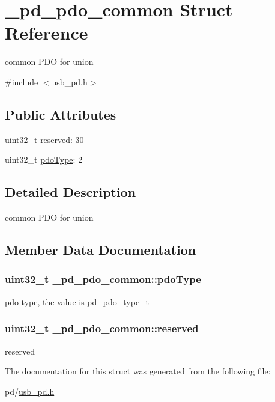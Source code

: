 \hypertarget{struct__pd__pdo__common}{\section{\-\_\-pd\-\_\-pdo\-\_\-common Struct Reference}
\label{struct__pd__pdo__common}
}


common P\-D\-O for union  




{\ttfamily \#include $<$usb\-\_\-pd.\-h$>$}

\subsection*{Public Attributes}
\begin{DoxyCompactItemize}
\item 
uint32\-\_\-t \hyperlink{struct__pd__pdo__common_abf0630cb9ee09ce0bb24f2455f048e40}{reserved}\-: 30
\item 
uint32\-\_\-t \hyperlink{struct__pd__pdo__common_a5a1a819ee8e548be9b972852c75aa597}{pdo\-Type}\-: 2
\end{DoxyCompactItemize}


\subsection{Detailed Description}
common P\-D\-O for union 

\subsection{Member Data Documentation}
\hypertarget{struct__pd__pdo__common_a5a1a819ee8e548be9b972852c75aa597}{
\subsubsection[{pdo\-Type}]{\setlength{\rightskip}{0pt plus 5cm}uint32\-\_\-t \-\_\-pd\-\_\-pdo\-\_\-common\-::pdo\-Type}}\label{struct__pd__pdo__common_a5a1a819ee8e548be9b972852c75aa597}
pdo type, the value is \hyperlink{group__usb__pd__stack_ga1ed8c8629c16f0246f723f164abfe7d4}{pd\-\_\-pdo\-\_\-type\-\_\-t} \hypertarget{struct__pd__pdo__common_abf0630cb9ee09ce0bb24f2455f048e40}{
\subsubsection[{reserved}]{\setlength{\rightskip}{0pt plus 5cm}uint32\-\_\-t \-\_\-pd\-\_\-pdo\-\_\-common\-::reserved}}\label{struct__pd__pdo__common_abf0630cb9ee09ce0bb24f2455f048e40}
reserved 

The documentation for this struct was generated from the following file\-:\begin{DoxyCompactItemize}
\item 
pd/\hyperlink{usb__pd_8h}{usb\-\_\-pd.\-h}\end{DoxyCompactItemize}
